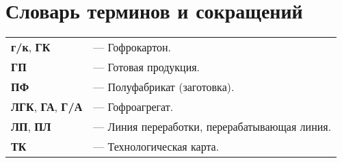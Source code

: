 
\def \notincludehead{}






 	\maketitle

% 	

	\scriptsize
	\setcounter{tocdepth}{4}
	\tableofcontents
	\normalsize
	\newpage

 	
 	
 	 	
 	
 	\newpage
 	
 	
 \section*{Словарь терминов и сокращений}
\noindent

\begin{tabular}{l l}
{\bf г/к}, {\bf ГК}  & --- Гофрокартон.\\
{\bf ГП}  & --- Готовая продукция.\\
{\bf ПФ}  & --- Полуфабрикат (заготовка).\\
{\bf ЛГК}, {\bf ГА}, {\bf Г/А}  & --- Гофроагрегат.\\
{\bf ЛП}, {\bf ПЛ}  & --- Линия переработки, перерабатывающая линия.\\
{\bf ТК}  & --- Технологическая карта.\\
	
\end{tabular}






\newcommand*{\IsScancode}{1}  %
\newcommand*{\IsOKP}{0}  %




\newpage



